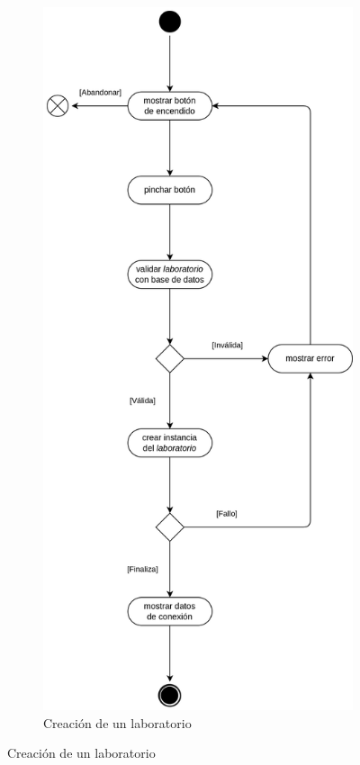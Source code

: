 \begin{figure}[h]
\begin{subfigure}{0.45\textwidth}
                    \includegraphics[scale=0.115]{images/Diagramas/Actividades y transiciones 4.png}
                    \caption{Creación de un laboratorio}
                    \label{fig:creacion-laboratorio}
                \end{subfigure}

\end{figure}
